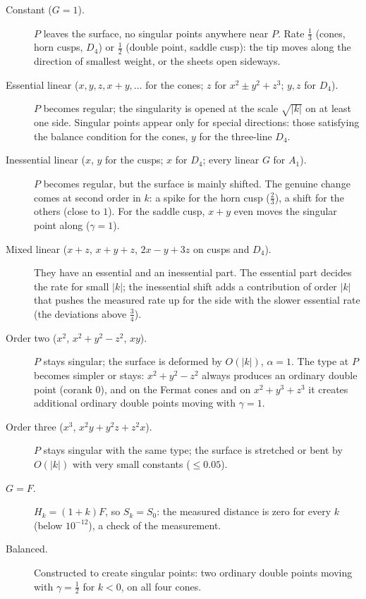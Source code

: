 \documentclass[12pt, a4paper]{article}
\theoremstyle{plain}
\theoremstyle{definition}
\theoremstyle{remark}
\theoremstyle{definition}
\begin{document}
\begin{description}
    \item[Constant ($G=1$).] $P$ leaves the surface, no singular points anywhere
          near $P$. Rate $\tfrac13$ (cones, horn cusps, $D_4$) or $\tfrac12$ (double
          point, saddle cusp): the tip moves along the direction of smallest weight,
          or the sheets open sideways.
    \item[Essential linear ($x,y,z,x+y,\dots$ for the cones; $z$ for $x^2\pm y^2+z^3$;
          $y,z$ for $D_4$).] $P$ becomes regular; the singularity is opened at the
          scale $\sqrt{|k|}$ on at least one side. Singular points appear only for
          special directions: those satisfying the balance condition for the cones,
          $y$ for the three-line $D_4$.
    \item[Inessential linear ($x$, $y$ for the cusps; $x$ for $D_4$; every linear
          $G$ for $A_1$).] $P$ becomes regular, but the surface is mainly shifted.
          The genuine change comes at second order in $k$: a spike for the horn
          cusp ($\tfrac23$), a shift for the others (close to $1$). For the saddle cusp,
          $x+y$ even moves the singular point along ($\gamma=1$).
    \item[Mixed linear ($x+z$, $x+y+z$, $2x-y+3z$ on cusps and $D_4$).] They have an
          essential and an inessential part. The essential part decides the rate
          for small $|k|$; the inessential shift adds a contribution of order $|k|$
          that pushes the measured rate up for the side with the slower essential
          rate (the deviations above $\tfrac34$).
    \item[Order two ($x^2$, $x^2+y^2-z^2$, $xy$).] $P$ stays singular; the surface is
          deformed by $O(|k|)$, $\alpha=1$. The type at $P$ becomes simpler or stays:
          $x^2+y^2-z^2$ always produces an ordinary double point (corank $0$), and on
          the Fermat cones and on $x^2+y^3+z^3$ it creates additional ordinary double
          points moving with $\gamma=1$.
    \item[Order three ($x^3$, $x^2y+y^2z+z^2x$).] $P$ stays singular with the same
          type; the surface is stretched or bent by $O(|k|)$ with very small
          constants ($\le0.05$).
    \item[$G=F$.] $H_k=(1+k)F$, so $S_k=S_0$: the measured distance is zero for every
          $k$ (below $10^{-12}$), a check of the measurement.
    \item[Balanced.] Constructed to create singular points: two ordinary double
          points moving with $\gamma=\tfrac12$ for $k<0$, on all four cones.
\end{description}
\end{document}
